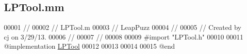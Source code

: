 \hypertarget{_l_p_tool_8mm}{\subsection{L\-P\-Tool.\-mm}
\label{d9/db1/_l_p_tool_8mm}
}

\begin{DoxyCode}
00001 \textcolor{comment}{//}
00002 \textcolor{comment}{//  LPTool.m}
00003 \textcolor{comment}{//  LeapPuzz}
00004 \textcolor{comment}{//}
00005 \textcolor{comment}{//  Created by cj on 3/29/13.}
00006 \textcolor{comment}{//}
00007 \textcolor{comment}{//}
00008 
00009 \textcolor{preprocessor}{#import "LPTool.h"}
00010 
00011 \textcolor{keyword}{@implementation }\hyperlink{interface_l_p_tool}{LPTool}
00012 
00013 
00014 
00015 \textcolor{keyword}{@end}
\end{DoxyCode}
